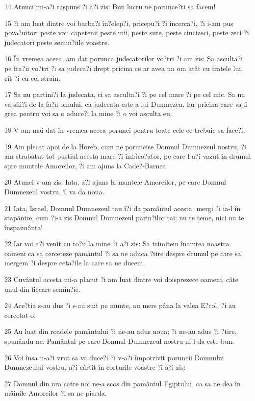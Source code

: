 \par 14 Atunci mi-a?i raspuns ?i a?i zis: Bun lucru ne porunce?ti sa facem!
\par 15 ?i am luat dintre voi barba?i în?elep?i, pricepu?i ?i încerca?i, ?i i-am pus pova?uitori peste voi: capetenii peste mii, peste sute, peste cincizeci, peste zeci ?i judecatori peste semin?iile voastre.
\par 16 În vremea aceea, am dat porunca judecatorilor vo?tri ?i am zis: Sa asculta?i pe fra?ii vo?tri ?i sa judeca?i drept pricina ce ar avea un om atât cu fratele lui, cît ?i cu cel strain.
\par 17 Sa nu partini?i la judecata, ci sa asculta?i ?i pe cel mare ?i pe cel mic. Sa nu va sfii?i de la fa?a omului, ca judecata este a lui Dumnezeu. Iar pricina care va fi grea pentru voi sa o aduce?i la mine ?i o voi asculta eu.
\par 18 V-am mai dat în vremea aceea porunci pentru toate cele ce trebuie sa face?i.
\par 19 Am plecat apoi de la Horeb, cum ne poruncise Domnul Dumnezeul nostru, ?i am strabatut tot pustiul acesta mare ?i înfrico?ator, pe care l-a?i vazut în drumul spre muntele Amoreilor, ?i am ajuns la Cade?-Barnea.
\par 20 Atunci v-am zis: Iata, a?i ajuns la muntele Amoreilor, pe care Domnul Dumnezeul vostru, îl va da noua.
\par 21 Iata, Israel, Domnul Dumnezeul tau î?i da pamântul acesta: mergi ?i ia-l în stapânire, cum ?i-a zis Domnul Dumnezeul parin?ilor tai; nu te teme, nici nu te înspaimânta!
\par 22 Iar voi a?i venit cu to?ii la mine ?i a?i zis: Sa trimitem înaintea noastra oameni ca sa cerceteze pamântul ?i sa ne aduca ?tire despre drumul pe care sa mergem ?i despre ceta?ile la care sa ne ducem.
\par 23 Cuvântul acesta mi-a placut ?i am luat dintre voi doisprezece oameni, câte unul din fiecare semin?ie.
\par 24 Ace?tia s-au dus ?i s-au suit pe munte, au mers pâna la valea E?col, ?i au cercetat-o.
\par 25 Au luat din roadele pamântului ?i ne-au adus noua; ?i ne-au adus ?i ?tire, spunându-ne: Pamântul pe care Domnul Dumnezeul nostru ni-l da este bun.
\par 26 Voi însa n-a?i vrut sa va duce?i ?i v-a?i împotrivit poruncii Domnului Dumnezeului vostru, a?i cârtit în corturile voastre ?i a?i zis:
\par 27 Domnul din ura catre noi ne-a scos din pamântul Egiptului, ca sa ne dea în mâinile Amoreilor ?i sa ne piarda.
